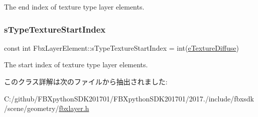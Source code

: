 The end index of texture type layer elements. 

\mbox{\label{class_fbx_layer_element_a207301b1a6ecb7cdbce89cb44093d0b7}} 
\subsubsection{\texorpdfstring{s\+Type\+Texture\+Start\+Index}{sTypeTextureStartIndex}}
{\footnotesize\ttfamily const int Fbx\+Layer\+Element\+::s\+Type\+Texture\+Start\+Index = int(\hyperlink{class_fbx_layer_element_a8c95c5cd880b56c776acd379bd86f42ca09829e6ecf512e7ae04d9ad8de1342fa}{e\+Texture\+Diffuse})\hspace{0.3cm}{\ttfamily [static]}}



The start index of texture type layer elements. 



このクラス詳解は次のファイルから抽出されました\+:\begin{DoxyCompactItemize}
\item 
C\+:/github/\+F\+B\+Xpython\+S\+D\+K201701/\+F\+B\+Xpython\+S\+D\+K201701/2017./include/fbxsdk/scene/geometry/\hyperlink{fbxlayer_8h}{fbxlayer.\+h}\end{DoxyCompactItemize}
